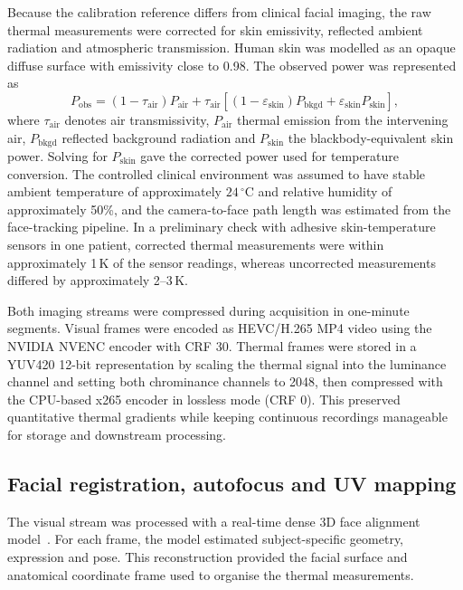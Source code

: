 \documentclass[11pt]{article}
\begin{document}
Because the calibration reference differs from clinical facial imaging, the raw thermal measurements were corrected for skin emissivity, reflected ambient radiation and atmospheric transmission. Human skin was modelled as an opaque diffuse surface with emissivity close to 0.98. The observed power was represented as
\[
  P_{\mathrm{obs}} = (1-\tau_{\mathrm{air}})P_{\mathrm{air}} +
  \tau_{\mathrm{air}}\left[(1-\varepsilon_{\mathrm{skin}})P_{\mathrm{bkgd}} +
  \varepsilon_{\mathrm{skin}}P_{\mathrm{skin}}\right],
\]
where $\tau_{\mathrm{air}}$ denotes air transmissivity, $P_{\mathrm{air}}$ thermal emission from the intervening air, $P_{\mathrm{bkgd}}$ reflected background radiation and $P_{\mathrm{skin}}$ the blackbody-equivalent skin power. Solving for $P_{\mathrm{skin}}$ gave the corrected power used for temperature conversion. The controlled clinical environment was assumed to have stable ambient temperature of approximately $24\,^\circ\mathrm{C}$ and relative humidity of approximately 50\%, and the camera-to-face path length was estimated from the face-tracking pipeline. In a preliminary check with adhesive skin-temperature sensors in one patient, corrected thermal measurements were within approximately 1\,K of the sensor readings, whereas uncorrected measurements differed by approximately 2--3\,K.

Both imaging streams were compressed during acquisition in one-minute segments. Visual frames were encoded as HEVC/H.265 MP4 video using the NVIDIA NVENC encoder with CRF 30. Thermal frames were stored in a YUV420 12-bit representation by scaling the thermal signal into the luminance channel and setting both chrominance channels to 2048, then compressed with the CPU-based x265 encoder in lossless mode (CRF 0). This preserved quantitative thermal gradients while keeping continuous recordings manageable for storage and downstream processing.

\subsection*{Facial registration, autofocus and UV mapping}
\label{sec:registration}

The visual stream was processed with a real-time dense 3D face alignment model~\citep{guo2020towards}. For each frame, the model estimated subject-specific geometry, expression and pose. This reconstruction provided the facial surface and anatomical coordinate frame used to organise the thermal measurements.
\end{document}

